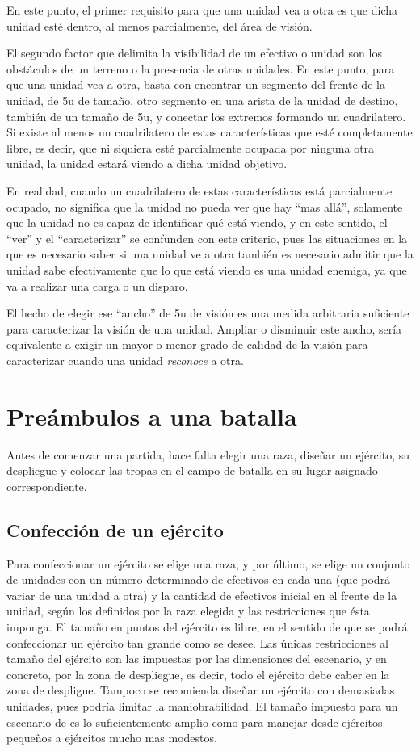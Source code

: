 En este punto, el primer requisito para que una unidad vea a otra es
que dicha unidad esté dentro, al menos parcialmente, del área de
visión.

El segundo factor que delimita la visibilidad de un efectivo o unidad
son los obstáculos de un terreno o la presencia de otras
unidades. En este punto, para que una unidad vea a otra, basta con
encontrar un segmento del frente de la unidad, de 5u de tamaño, otro
segmento en una arista de la unidad de destino, también de un tamaño
de 5u, y conectar los extremos formando un cuadrilatero. Si existe al
menos un cuadrilatero de estas características que esté completamente
libre, es decir, que ni siquiera esté parcialmente ocupada por ninguna
otra unidad, la unidad estará viendo a dicha unidad objetivo.

En realidad, cuando un cuadrilatero de estas características está
parcialmente ocupado, no significa que la unidad no pueda ver que hay
``mas allá'', solamente que la unidad no es capaz de identificar qué
está viendo, y en este sentido, el ``ver'' y el ``caracterizar'' se
confunden con este criterio, pues las situaciones en la que es
necesario saber si una unidad ve a otra también es necesario admitir
que la unidad sabe efectivamente que lo que está viendo es una unidad enemiga, ya que
va a realizar una carga o un disparo.

El hecho de elegir ese ``ancho'' de 5u de visión es una medida
arbitraria suficiente para caracterizar la visión de una
unidad. Ampliar o disminuir este ancho, sería equivalente a exigir
un mayor o menor grado de calidad de la visión para caracterizar
cuando una unidad \emph{reconoce} a otra.

\section*{Preámbulos a una batalla}
Antes de comenzar una partida, hace falta elegir una raza, diseñar un
ejército, su despliegue y colocar las tropas en el campo de batalla en
su lugar asignado correspondiente.

\subsection*{Confección de un ejército}
\label{confeccionejercito}
Para confeccionar un ejército se elige una raza, y por último, se
elige un conjunto de unidades con un número determinado de efectivos
en cada una (que podrá variar de una unidad a otra) y la cantidad de
efectivos inicial en el frente de la unidad, según los definidos por
la raza elegida y las restricciones que ésta imponga. El tamaño en
puntos del ejército es libre, en el sentido de que se podrá
confeccionar un ejército tan grande como se desee. Las únicas
restricciones al tamaño del ejército son las impuestas por las
dimensiones del escenario, y en concreto, por la zona de despliegue,
es decir, todo el ejército debe caber en la zona de despligue. Tampoco
se recomienda diseñar un ejército con demasiadas unidades, pues
podría limitar la maniobrabilidad. El tamaño impuesto para un
escenario de \gom es lo suficientemente amplio como para manejar desde
ejércitos pequeños a ejércitos mucho mas modestos.

